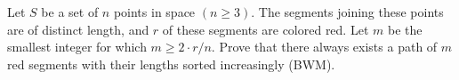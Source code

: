 Let $S$ be a set of $n$ points in space $(n \geq 3)$. The segments joining these points are of distinct length, and $r$ of these segments are colored red. Let $m$ be the smallest integer for which $m \geq 2 \cdot r/n$. Prove that there always exists a path of $m$ red segments with their lengths sorted increasingly (BWM).
